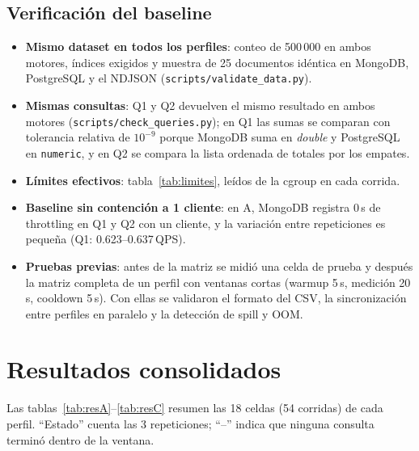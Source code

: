 \documentclass[11pt,letterpaper]{article}
\newcommand{\tablaperfil}[1]{%
    \begin{table}[H]\centering\scriptsize\setlength{\tabcolsep}{3.5pt}
    \caption{Resultados consolidados del perfil #1: mediana de 3 repeticiones. Latencias en
    segundos; throttling y RSS máximo de la ventana de medición de 300\,s.}
    \label{tab:res#1}
    
    \end{table}}
\begin{document}
\subsection{Verificación del baseline}
\begin{itemize}
  \item \textbf{Mismo dataset en todos los perfiles}: conteo de 500\,000 en ambos motores, índices
        exigidos y muestra de 25 documentos idéntica en MongoDB, PostgreSQL y el NDJSON
        (\texttt{scripts/validate\_data.py}).
  \item \textbf{Mismas consultas}: Q1 y Q2 devuelven el mismo resultado en ambos motores
        (\texttt{scripts/check\_queries.py}); en Q1 las sumas se comparan con tolerancia relativa
        de $10^{-9}$ porque MongoDB suma en \emph{double} y PostgreSQL en \texttt{numeric}, y en Q2 se compara la lista ordenada de totales por los empates.
  \item \textbf{Límites efectivos}: tabla~\ref{tab:limites}, leídos de la cgroup en cada corrida.
  \item \textbf{Baseline sin contención a 1 cliente}: en A, MongoDB registra 0\,s de throttling en
        Q1 y Q2 con un cliente, y la variación entre repeticiones es pequeña (Q1: 0.623--0.637\,QPS).
  \item \textbf{Pruebas previas}: antes de la matriz se midió una celda de prueba y después
        la matriz completa de un perfil con ventanas cortas (warmup 5\,s, medición 20\,s,
        cooldown 5\,s). Con ellas se validaron el formato del CSV, la sincronización entre
        perfiles en paralelo y la detección de spill y OOM.
\end{itemize}

\section{Resultados consolidados}
\label{sec:resultados}

Las tablas~\ref{tab:resA}--\ref{tab:resC} resumen las 18 celdas (54 corridas) de cada perfil. ``Estado''
cuenta las 3 repeticiones; ``--'' indica que ninguna consulta terminó dentro de la ventana.

\tablaperfil{A}
\tablaperfil{B}
\tablaperfil{C}
\end{document}
